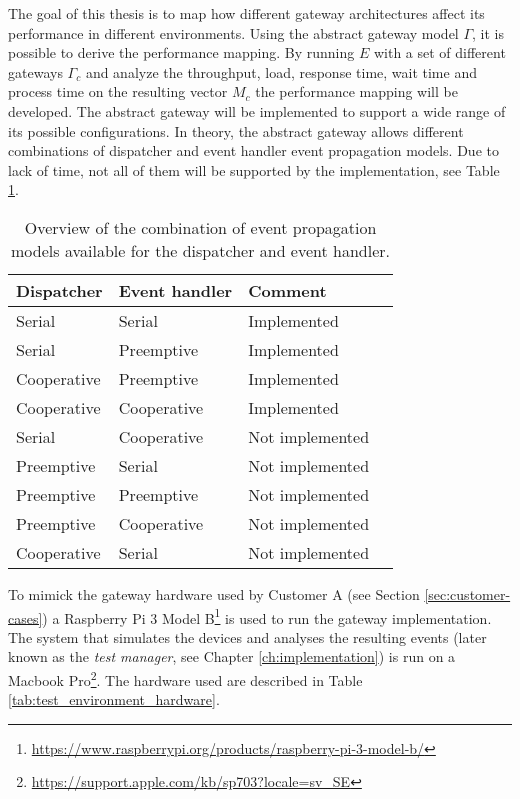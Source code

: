 The goal of this thesis is to map how different gateway architectures affect
its performance in different environments. Using the abstract gateway model
$\Gamma$, it is possible to derive the performance mapping. By running $E$ with
a set of different gateways $\Gamma_c$ and analyze the throughput, load,
response time, wait time and process time on the resulting vector $M_c$ the
performance mapping will be developed. The abstract gateway will be implemented
to support a wide range of its possible configurations. In theory, the abstract
gateway allows different combinations of dispatcher and event handler event
propagation models. Due to lack of time, not all of them will be supported by
the implementation, see Table \ref{tab:event_prop_combinations}.

\begin{table}[h!]

    \caption[Overview of the combination of event propagation models.]{Overview
    of the combination of event propagation models available for the dispatcher
    and event handler.}

    \label{tab:event_prop_combinations}

    \begin{center}
        \begin{tabular}{|l|l|l|l|}
            \hline
            Dispatcher  & Event handler & Comment \\
            \hline
            Serial      & Serial        & Implemented \\
            Serial      & Preemptive    & Implemented \\
            Cooperative & Preemptive    & Implemented \\
            Cooperative & Cooperative   & Implemented \\
            Serial      & Cooperative   & Not implemented \\
            Preemptive  & Serial        & Not implemented \\
            Preemptive  & Preemptive    & Not implemented \\
            Preemptive  & Cooperative   & Not implemented \\
            Cooperative & Serial        & Not implemented \\
            \hline
        \end{tabular}
    \end{center}
\end{table}

To mimick the gateway hardware used by Customer A (see Section
\ref{sec:customer-cases}) a Raspberry Pi 3 Model
B\footnote{\url{https://www.raspberrypi.org/products/raspberry-pi-3-model-b/}}
is used to run the gateway implementation. The system that simulates the
devices and analyses the resulting events (later known as the \textit{test
manager}, see Chapter \ref{ch:implementation}) is run on a Macbook
Pro\footnote{\url{https://support.apple.com/kb/sp703?locale=sv_SE}}. The
hardware used are described in Table \ref{tab:test_environment_hardware}.

